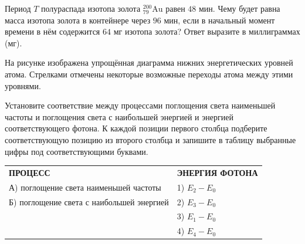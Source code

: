 \begin{taskbasic}[code={\label{task:nuclear_decay_gold_mass}}]
Период $T$ полураспада изотопа золота $^{200}_{79}\text{Au}$ равен $48\text{ мин}$. Чему будет равна масса изотопа золота в контейнере через $96\text{ мин}$, если в начальный момент времени в нём содержится $64\text{ мг}$ изотопа золота? Ответ выразите в миллиграммах (мг).

\end{taskbasic}

\begin{taskbasic}[code={\label{task:atomic_levels_min_freq_max_energy}}]
На рисунке изображена упрощённая диаграмма нижних энергетических уровней атома. Стрелками отмечены некоторые возможные переходы атома между этими уровнями.

Установите соответствие между процессами поглощения света наименьшей частоты и поглощения света с наибольшей энергией и энергией соответствующего фотона. К каждой позиции первого столбца подберите соответствующую позицию из второго столбца и запишите в таблицу выбранные цифры под соответствующими буквами.

\nopagebreak\smallskip
\begin{center}
\end{center}

\smallskip
\begin{tabular}{p{}p{}}
\textbf{ПРОЦЕСС} & \textbf{ЭНЕРГИЯ ФОТОНА} \\
А) поглощение света наименьшей частоты & 1) $E_2 - E_0$ \\
Б) поглощение света с наибольшей энергией & 2) $E_3 - E_0$ \\
& 3) $E_1 - E_0$ \\
& 4) $E_4 - E_0$
\end{tabular}

\end{taskbasic}


